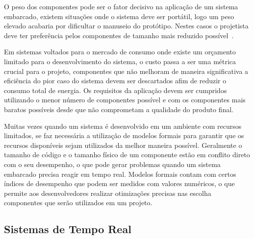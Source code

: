 O peso dos componentes pode ser o fator decisivo na aplicação de um sistema embarcado, existem situações onde o sistema deve ser portátil, logo um peso elevado acabaria por dificultar o manuseio do protótipo. Nestes casos o projetista deve ter preferência pelos componentes de tamanho mais reduzido possível~\cite{marwedel:2011}.

Em sistemas voltados para o mercado de consumo onde existe um orçamento limitado para o desenvolvimento do sistema, o custo passa a ser uma métrica crucial para o projeto, componentes que não melhoram de maneira significativa a eficiência do pior caso do sistema devem ser descartados afim de reduzir o consumo total de energia. Os requisitos da aplicação devem ser cumpridos utilizando o menor número de componentes possível e com os componentes mais baratos possíveis desde que não comprometam a qualidade do produto final. \cite{marwedel:2011}


Muitas vezes quando um sistema é desenvolvido em um ambiente com recursos limitados, se faz necessária a utilização de modelos formais para garantir que os recursos disponíveis sejam utilizados da melhor maneira possível. Geralmente o tamanho de código e o tamanho físico de um componente estão em conflito direto com o seu desempenho, o que pode gerar problemas quando um sistema embarcado precisa reagir em tempo real. Modelos formais contam com certos índices de desempenho que podem ser medidos com valores numéricos, o que permite aos desenvolvedores realizar otimizações precisas nas escolha componentes que serão utilizados em um projeto.  

\subsection{Sistemas de Tempo Real} %

